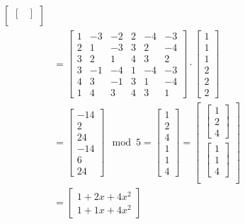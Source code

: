 \begin{align*}
{\begin{bmatrix}
\begin{bmatrix}
    \end{bmatrix} \\
  \end{bmatrix}
  }               \\
            & = {
  \begin{bmatrix}
    1 & -3 & -2 & 2 & -4 & -3 \\
    2 & 1  & -3 & 3 & 2  & -4 \\
    3 & 2  & 1  & 4 & 3  & 2  \\
    3 & -1 & -4 & 1 & -4 & -3 \\
    4 & 3  & -1 & 3 & 1  & -4 \\
    1 & 4  & 3  & 4 & 3  & 1 
  \end{bmatrix}
  \cdot
  \begin{bmatrix}
    1 \\
    1 \\
    1 \\
    2 \\
    2 \\
    2 
  \end{bmatrix}
  }               \\
            & = {
  \begin{bmatrix}
    -14 \\
    2   \\
    24  \\
    -14 \\
    6   \\
    24
  \end{bmatrix}
  \mod 5
  }
  = {
  \begin{bmatrix}
    1 \\
    2 \\
    4 \\
    1 \\
    1 \\
    4
  \end{bmatrix}
  }
            = {
  \begin{bmatrix}
    \begin{bmatrix}
      1 \\
      2 \\
      4
    \end{bmatrix} \\
    \begin{bmatrix}
      1 \\
      1 \\
      4
    \end{bmatrix} \\
  \end{bmatrix}
  } \\
            & = {
  \begin{bmatrix}
      1+2x+4x^2 \\
      1+1x+4x^2
  \end{bmatrix}
  }
\end{align*}

